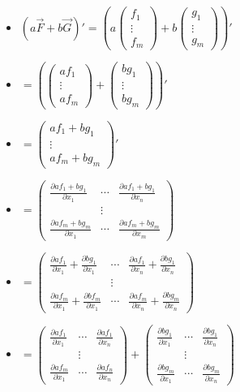 \documentclass[]{article}
\providecommand{\tightlist}{%
  \setlength{\itemsep}{0pt}\setlength{\parskip}{0pt}}
\begin{document}
\begin{itemize}
\tightlist
\item
  \((a \vec{F} + b \vec{G})' =\left(a \begin{pmatrix} f_1 \\ \vdots \\ f_m \end{pmatrix} + b \begin{pmatrix} g_1\\ \vdots \\ g_m \end{pmatrix}\right)'\)
\item
  \(=\left(\begin{pmatrix} a f_1 \\\vdots\\ a f_m \end{pmatrix} + \begin{pmatrix} b g_1 \\ \vdots \\ b g_m \end{pmatrix}\right)'\)
\item
  \(=\begin{pmatrix} a f_1 + b g_1 \\ \vdots \\ a f_m + b g_m \end{pmatrix}'\)
\item
  \(=\begin{pmatrix} \frac{\partial a f_1 + b g_1}{\partial x_1} &\cdots &\frac{\partial a f_1+ b g_1}{\partial x_n} \\ &\vdots & \\ \frac{\partial a f_m + b g_m }{\partial x_1} & \cdots & \frac{\partial a f_m + b g_m}{\partial x_m}\end{pmatrix}\)
\item
  \(=\begin{pmatrix}\frac{\partial a f_1}{\partial x_1} + \frac{\partial b g_1}{\partial x_1} &\cdots &\frac{\partial a f_1}{\partial x_n}+\frac{\partial bg_1}{\partial x_n}\\ &\vdots&\\ \frac{\partial a f_m}{\partial x_1} + \frac{\partial b f_m}{\partial x_1} &\cdots & \frac{\partial a f_m}{\partial x_n}+\frac{\partial b g_m}{\partial x_n}\end{pmatrix}\)
\item
  \(=\begin{pmatrix} \frac{\partial a f_1}{\partial x_1} & \cdots & \frac{\partial a f_1}{\partial x_n} \\ &\vdots&\\ \frac{\partial a f_m}{\partial x_1} &\cdots& \frac{\partial a f_n}{\partial x_n} \end{pmatrix} + \begin{pmatrix} \frac{\partial b g_1}{\partial x_1} & \cdots & \frac{\partial b g_1}{\partial x_n} \\ &\vdots& \\ \frac{\partial b g_m}{\partial x_1} &\cdots& \frac{\partial b g_m}{\partial x_n} \end{pmatrix}\)

\end{itemize}
\end{document}
